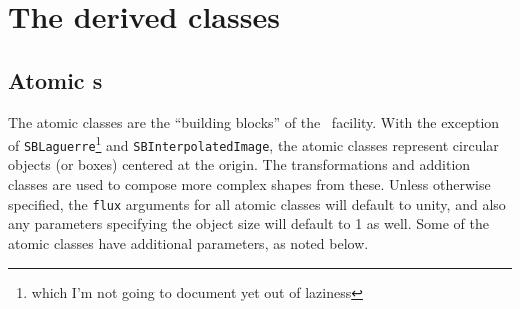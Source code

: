 \documentclass[11pt,preprint,flushrt]{aastex}
\begin{document}
\section{The derived classes}
\subsection{Atomic {\sbp}s}
The atomic classes are the ``building blocks'' of the \sbp\ facility.  With the exception of {\tt SBLaguerre}\footnote{which I'm not going to document yet out of laziness} and {\tt SBInterpolatedImage}, the atomic classes represent circular objects (or boxes) centered at the origin.  The transformations and addition classes are used to compose more complex shapes from these.  Unless otherwise specified, the {\tt flux} arguments for all atomic classes will default to unity, and also any parameters specifying the object size will default to 1 as well.   Some of the atomic classes have additional parameters, as noted below.
\end{document}
